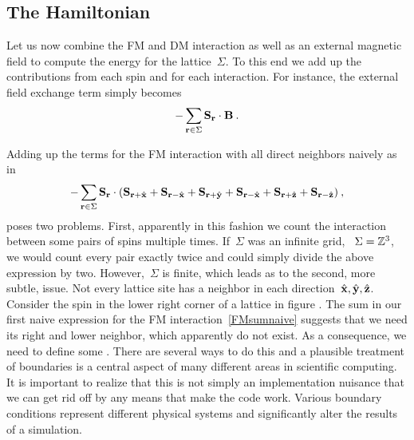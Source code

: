 
\subsection{The Hamiltonian}

Let us now combine the FM and DM interaction as well as an external magnetic
field to compute the energy for the lattice~$\Sigma$. To this end we add up the
contributions from each spin and for each interaction. For instance, the
external field exchange term simply becomes
%
\begin{equation}\label{Bsum}
  -\sum_{\mathbf{r} \in \Sigma} \mathbf{S}_{\mathbf{r}} \cdot \mathbf{B}\:.
\end{equation}
%

Adding up the terms for the FM interaction with all direct neighbors naively as
in
%
\begin{equation}\label{FMsumnaive}
  -\sum_{\mathbf{r} \in \Sigma} \mathbf{S}_{\mathbf{r}} \cdot (\mathbf{S}_{\mathbf{r} + \hat{\mathbf{x}}} + \mathbf{S}_{\mathbf{r} - \hat{\mathbf{x}}} +
    \mathbf{S}_{\mathbf{r} + \hat{\mathbf{y}}} + \mathbf{S}_{\mathbf{r} - \hat{\mathbf{x}}} + \mathbf{S}_{\mathbf{r} + \hat{\mathbf{z}}} + \mathbf{S}_{\mathbf{r} - \hat{\mathbf{z}}})\:,
\end{equation}
%
poses two problems. First, apparently in this fashion we count the interaction
between some pairs of spins multiple times. If~$\Sigma$ was an infinite grid,
\ie{}~$\Sigma=\mathbb{Z}^3$, we would count every pair exactly twice and could simply
divide the above expression by two. However,~$\Sigma$ is finite, which leads as
to the second, more subtle, issue. Not every lattice site has a neighbor in each
direction~$\hat{\mathbf{x}}, \hat{\mathbf{y}}, \hat{\mathbf{z}}$. Consider the spin in the lower right corner of a
lattice in figure . The sum in our first naive expression for the FM
interaction~\eqref{FMsumnaive} suggests that we need its right and lower
neighbor, which apparently do not exist. As a consequence, we need to define
some . There are several ways to do this and a
plausible treatment of boundaries is a central aspect of many different areas in
scientific computing. It is important to realize that this is not simply an
implementation nuisance that we can get rid off by any means that make the
code work. Various boundary conditions represent different physical systems and
significantly alter the results of a simulation.

